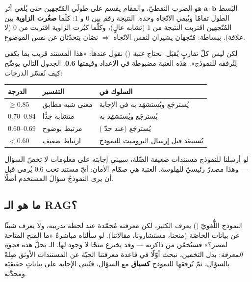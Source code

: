 \begin{idea}[الفكرة: الزاوية الصغيرة = تشابه عالٍ]
البَسط $\mathbf{a}\cdot\mathbf{b}$ هو الضرب النقطيّ، والمقام يقسم على طولَي
المُتّجهين حتى يُلغي أثر الطول تمامًا ويُبقي الاتّجاه وحده. النتيجة رقم بين $0$
و $1$: كلّما \textbf{صغُرت الزاوية} بين المُتّجهين اقتربت النتيجة من $1$ (تشابه
عالٍ)، وكلّما كبُرت الزاوية اقتربت من $0$ (لا علاقة). ببساطة: مُتّجهان يشيران لنفس
الاتّجاه $\Rightarrow$ نصّان يتحدّثان عن نفس الموضوع.
\end{idea}

لكن ليس كلّ تقاربٍ يُقبَل. نحتاج \emph{عتبة} () نقول عندها: «هذا
المستند قريب بما يكفي لِنُرفقه للنموذج». هذه العتبة مضبوطة في الإعداد
 وقيمتها \textbf{0.6}. الجدول التالي يوضّح كيف نُفسّر الدرجات:

\begin{center}
\begin{tabular}{L{2.8cm} L{4.2cm} L{6.6cm}}
\toprule
\textbf{\color{spPrimary}الدرجة} & \textbf{\color{spPrimary}التفسير} & \textbf{\color{spPrimary}السلوك في }\\
\midrule
$\geq 0.85$ & معنى شبه مطابق & يُسترجَع ويُستشهَد به في الإجابة\\
$0.70$–$0.84$ & متشابه جدًّا & يُسترجَع ويُستشهَد به\\
$0.60$–$0.69$ & مرتبط بوضوح & يُسترجَع (عند حدّ )\\
$< 0.60$ & ارتباط ضعيف & يُستبعَد قبل إرسال البرومبت للنموذج\\
\bottomrule
\end{tabular}
\end{center}

\begin{keyp}
لو أرسلنا للنموذج مستندات ضعيفة الصِّلة، سيبني إجابته على معلومات لا تخصّ السؤال —
وهذا مصدرٌ رئيسيّ للهلوسة. العتبة  هي صمّام الأمان: أيّ مستند
تحت 0.6 يُرمى قبل أن يرى النموذجُ سؤالَ المستخدم أصلًا.
\end{keyp}

\subsection{ما هو الـ RAG؟}

\begin{idea}
النموذج اللُّغويّ () يعرف الكثير، لكن معرفته مُجمّدة عند لحظة تدريبه، ولا
يعرف شيئًا عن بيانات  الخاصّة (منحنا، مستشارونا، مقالاتنا). لو سألناه
مباشرةً «ما المنح المتاحة لمصر؟» فسيُخمّن من ذاكرته — وقد يخترع منحًا لا وجود لها.
الـ  يحلّ هذه \emph{فجوة المعرفة}: بدل التخمين، نبحث أوّلًا في قاعدة معرفتنا
الحيّة عن المستندات الأوثق صِلةً بالسؤال، ثمّ نُرفقها للنموذج \textbf{كسياق} مع
السؤال، فتُبنى الإجابة على بياناتٍ حقيقيّة ومحدَّثة.
\end{idea}

